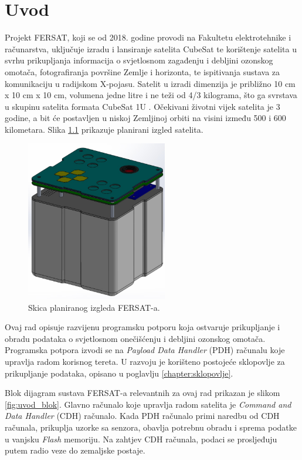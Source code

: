 \chapter{Uvod}
    Projekt FERSAT, koji se od 2018. godine provodi na Fakultetu elektrotehnike i računarstva, uključuje izradu i lansiranje satelita CubeSat te korištenje satelita u svrhu prikupljanja informacija o svjetlosnom zagađenju i debljini ozonskog omotača, fotografiranja površine Zemlje i horizonta, te ispitivanja sustava za komunikaciju u radijskom X-pojasu. Satelit u izradi dimenzija je približno 10 cm x 10 cm x 10 cm, volumena jedne litre i ne teži od 4/3 kilograma, što ga svrstava u skupinu satelita formata CubeSat 1U \cite{fersat_stranica_projekta}. Očekivani životni vijek satelita je 3 godine, a bit će postavljen u niskoj Zemljinoj orbiti na visini između 500 i 600 kilometara. Slika \ref{fig:fersat} prikazuje planirani izgled satelita.
    
    \begin{figure}[htb]
        \centering
        \includegraphics[height=7cm]{slike/fersat.png}
        \caption{Skica planiranog izgleda FERSAT-a. \cite{fersat_stranica_projekta}}
        \label{fig:fersat}
    \end{figure}

    Ovaj rad opisuje razvijenu programsku potporu koja ostvaruje prikupljanje i obradu podataka o svjetlosnom onečišćenju i debljini ozonskog omotača. Programska potpora izvodi se na \textit{Payload Data Handler} (PDH) računalu koje upravlja radom korisnog tereta. U razvoju je korišteno postojeće sklopovlje za prikupljanje podataka, opisano u poglavlju \ref{chapter:sklopovlje}.

    Blok dijagram sustava FERSAT-a relevantnih za ovaj rad prikazan je slikom \ref{fig:uvod_blok}. Glavno računalo koje upravlja radom satelita je \textit{Command and Data Handler} (CDH) računalo. Kada PDH računalo primi naredbu od CDH računala, prikuplja uzorke sa senzora, obavlja potrebnu obradu i sprema podatke u vanjsku \textit{Flash} memoriju. Na zahtjev CDH računala, podaci se prosljeđuju putem radio veze do zemaljske postaje. 
    
